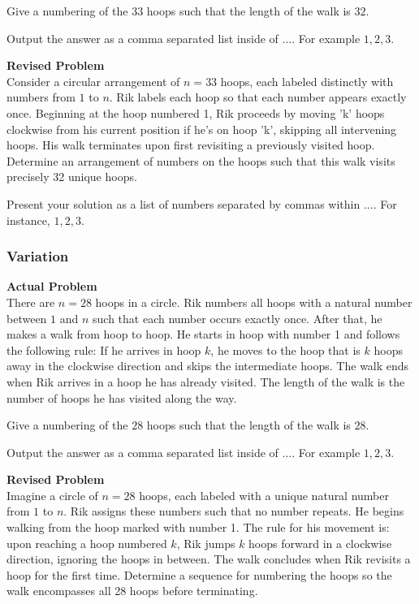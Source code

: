 Give a numbering of the $33$ hoops such that the length of the walk is $32$.

Output the answer as a comma separated list inside of $\boxed{...}$. For example $\boxed{1, 2, 3}$.

\textbf{Revised Problem}\\
Consider a circular arrangement of $n = 33$ hoops, each labeled distinctly with numbers from $1$ to $n$. Rik labels each hoop so that each number appears exactly once. Beginning at the hoop numbered 1, Rik proceeds by moving 'k' hoops clockwise from his current position if he's on hoop 'k', skipping all intervening hoops. His walk terminates upon first revisiting a previously visited hoop. Determine an arrangement of numbers on the hoops such that this walk visits precisely 32 unique hoops.

Present your solution as a list of numbers separated by commas within $\boxed{...}$. For instance, $\boxed{1, 2, 3}$.

\subsubsection{Variation}
\textbf{Actual Problem}\\
There are $n = 28$ hoops in a circle. Rik numbers all hoops with a natural number between $1$ and $n$ such that each number occurs exactly once. After that, he makes a walk from hoop to hoop. He starts in hoop with number 1 and follows the following rule: If he arrives in hoop $k$, he moves to the hoop that is $k$ hoops away in the clockwise direction and skips the intermediate hoops. The walk ends when Rik arrives in a hoop he has already visited. The length of the walk is the number of hoops he has visited along the way.

Give a numbering of the $28$ hoops such that the length of the walk is $28$.

Output the answer as a comma separated list inside of $\boxed{...}$. For example $\boxed{1, 2, 3}$.

\textbf{Revised Problem}\\
Imagine a circle of $n = 28$ hoops, each labeled with a unique natural number from $1$ to $n$. Rik assigns these numbers such that no number repeats. He begins walking from the hoop marked with number 1. The rule for his movement is: upon reaching a hoop numbered $k$, Rik jumps $k$ hoops forward in a clockwise direction, ignoring the hoops in between. The walk concludes when Rik revisits a hoop for the first time. Determine a sequence for numbering the hoops so the walk encompasses all 28 hoops before terminating.

